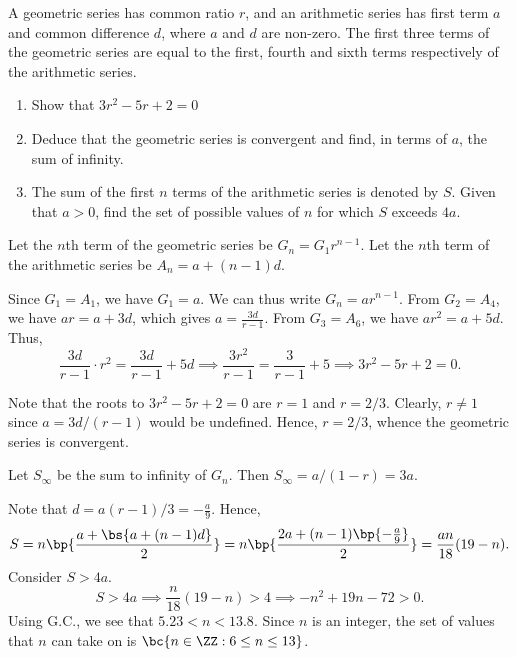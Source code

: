 \begin{problem}
    A geometric series has common ratio $r$, and an arithmetic series has first term $a$ and common difference $d$, where $a$ and $d$ are non-zero. The first three terms of the geometric series are equal to the first, fourth and sixth terms respectively of the arithmetic series.

    \begin{enumerate}
        \item Show that $3r^2 - 5r + 2 = 0$
        \item Deduce that the geometric series is convergent and find, in terms of $a$, the sum of infinity.
        \item The sum of the first $n$ terms of the arithmetic series is denoted by $S$. Given that $a > 0$, find the set of possible values of $n$ for which $S$ exceeds $4a$.
    \end{enumerate}
\end{problem}
\begin{solution}
    \begin{ppart}
        Let the $n$th term of the geometric series be $G_n = G_1r^{n-1}$. Let the $n$th term of the arithmetic series be $A_n = a + (n-1)d$.
        
        Since $G_1 = A_1$, we have $G_1 = a$. We can thus write $G_n = ar^{n-1}$. From $G_2 = A_4$, we have $ar = a + 3d$, which gives $a = \frac{3d}{r-1}$. From $G_3 = A_6$, we have $ar^2 = a + 5d$. Thus, \[\frac{3d}{r-1} \cdot r^2 = \frac{3d}{r-1} + 5d \implies \frac{3r^2}{r-1} = \frac{3}{r-1} + 5 \implies 3r^2 - 5r + 2 = 0.\]
    \end{ppart}
    \begin{ppart}
        Note that the roots to $3r^2 - 5r + 2 = 0$ are $r = 1$ and $r = 2/3$. Clearly, $r \neq 1$ since $a = 3d/(r-1)$ would be undefined. Hence, $r = 2/3$, whence the geometric series is convergent.

        Let $S_\infty$ be the sum to infinity of $G_n$. Then $S_\infty = a/(1-r) = 3a$.
    \end{ppart}
    \begin{ppart}
        Note that $d = a(r-1)/3 = -\frac{a}9$. Hence, \[S = n \bp{\frac{a + \bs{a + (n-1)d}}{2}} = n \bp{\frac{2a + (n-1)\bp{-\frac{a}9}}{2}} = \frac{an}{18}(19 - n).\] Consider $S > 4a$. \[S > 4a \implies \frac{n}{18} (19 - n) > 4 \implies -n^2 + 19n - 72 > 0.\] Using G.C., we see that  $5.23 < n < 13.8$. Since $n$ is an integer, the set of values that $n$ can take on is $\bc{n \in \ZZ : 6 \leq n \leq 13}$.
    \end{ppart}
\end{solution}

